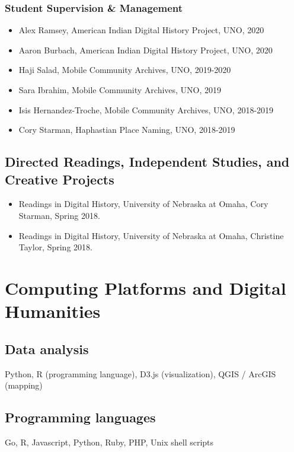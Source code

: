 \documentclass[10pt]{article}
\begin{document}
\subsubsection*{Student Supervision \& Management}

\begin{itemize}
  \item Alex Ramsey, American Indian Digital History Project, UNO, 2020
  \item Aaron Burbach, American Indian Digital History Project, UNO, 2020
  \item Haji Salad, Mobile Community Archives, UNO, 2019-2020
  \item Sara Ibrahim, Mobile Community Archives, UNO, 2019
  \item Isis Hernandez-Troche, Mobile Community Archives, UNO, 2018-2019
  \item Cory Starman, Haphastian Place Naming, UNO, 2018-2019
\end{itemize}

\subsection*{Directed Readings, Independent Studies, and Creative Projects}

\begin{itemize}
  \item Readings in Digital History, University of Nebraska at Omaha, Cory Starman, Spring 2018.
  \item Readings in Digital History, University of Nebraska at Omaha, Christine Taylor, Spring 2018.
\end{itemize}

\section{Computing Platforms and Digital Humanities}

\subsection*{Data analysis}
Python, R (programming language), D3.js (visualization), QGIS / ArcGIS (mapping)

\subsection*{Programming languages}
Go, R, Javascript, Python, Ruby, PHP, Unix shell scripts
\end{document}
